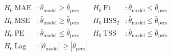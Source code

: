 \begin{align*}
    H_0\ \text{MAE}&: \bar{\theta}_{\text{model}} \geq \bar{\theta}_{\text{pers}} &
    H_0\ \text{F1}&: \bar{\theta}_{\text{model}} \leq \bar{\theta}_{\text{pers}} \\
    H_0\ \text{MSE}&: \bar{\theta}_{\text{model}} \geq \bar{\theta}_{\text{pers}} &
    H_0\ \text{HSS}_2&: \bar{\theta}_{\text{model}} \leq \bar{\theta}_{\text{pers}} \\
    H_0\ \text{PE}&: \bar{\theta}_{\text{model}} \leq \bar{\theta}_{\text{pers}} &
    H_0\ \text{TSS}&: \bar{\theta}_{\text{model}} \leq \bar{\theta}_{\text{pers}} \\
    H_0\ \text{Lag}&: |\bar{\theta}_{\text{model}}| \geq |\bar{\theta}_{\text{pers}}|
\end{align*}
